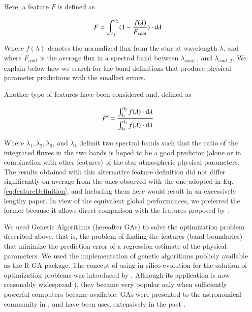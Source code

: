 Here, a feature $F$ is defined as

\begin{equation}\label{eq:featureDefinition}
  F = \int_{\lambda_{1}}^{\lambda_{2}} (1-\frac{f(\lambda)}{F_{cont}}) \cdot {\rm d}{\lambda}
\end{equation}

Where $f(\lambda)$ denotes the normalized flux from the star at
wavelength $\lambda$, and where $F_{cont}$ is the average flux in a
spectral band between $\lambda_{cont;1}$ and $\lambda_{cont;2}$. We
explain below how we search for the band definitions that produce
physical parameter predictions with the smallest errors.

Another type of features have been considered and, defined as

\begin{equation}\label{eq:feature2}
  F' = \frac{ \int_{\lambda_{1}}^{\lambda_{2}}f(\lambda) \cdot {\rm d}{\lambda}}
               {\int_{\lambda_{3}}^{\lambda_{4}} f(\lambda) \cdot {\rm d}{\lambda}} 
\end{equation}

Where $\lambda_1, \lambda_2, \lambda_3$, and
$\lambda_4$ delimit two spectral bands such that the ratio of the
integrated fluxes in the two bands is hoped to be a good predictor
(alone or in combination with other features) of the star atmospheric
physical parameters. The results obtained with this alternative
feature definition did not differ significantly on average from the
ones observed with the one adopted in Eq. \ref{eq:featureDefinition},
and including them here would result in an excessively lengthy
paper. In view of the equivalent global performances, we preferred the
former because it allows direct comparison with the features proposed
by \cite{cesetti}.

We used Genetic Algorithms (hereafter GAs) to solve the optimization
problem described above, that is, the problem of finding the features
(band boundaries) that minimize the prediction error of a regression
estimate of the physical parameters. We used the implementation of
genetic algorithms publicly available as the R \citep{R2013} GA
package. The concept of using in-silico evolution for the solution of
optimization problems was introduced
by \cite{holland1975adaptation}. Although its application is now
reasonably widespread \citep[see e.g. ]{goldberg1989genetic}), they
became very popular only when sufficiently powerful computers became
available. GAs were presented to the astronomical community
in \cite{1995ApJS..101..309C}, and have been used extensively in the
past \citep[see][for the last application of GAs in astronomy at the
time of writing]{2013A&A...550A..74D}.

